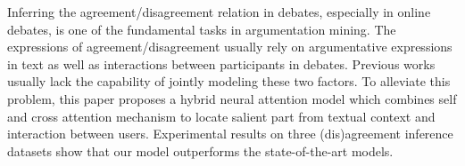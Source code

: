 Inferring the agreement/disagreement relation in debates, especially in online debates, is one of the fundamental tasks in argumentation mining. The expressions of agreement/disagreement usually rely on argumentative expressions in text as well as interactions between participants in debates. Previous works usually lack the capability of jointly modeling these two factors. To alleviate this problem, this paper proposes a hybrid neural attention model which combines self and cross attention mechanism to locate salient part from textual context and interaction between users. Experimental results on three (dis)agreement inference datasets show that our model outperforms the state-of-the-art models.
